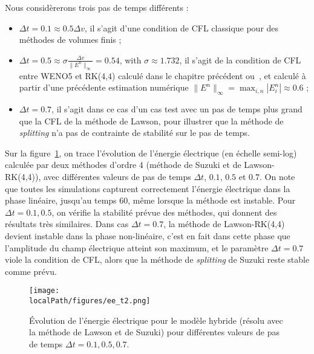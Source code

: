 Nous considèrerons trois pas de temps différents :
\begin{itemize}
  \item $\Delta t = 0.1 \approx 0.5\Delta v$, il s'agit d'une condition de CFL classique pour des méthodes de volumes finis ;
  \item $\Delta t = 0.5 \approx \sigma\frac{\Delta v}{\|E^n\|_\infty} = 0.54$, with $\sigma\approx 1.732$, il s'agit de la condition de CFL entre WENO5 et RK($4$,$4$) calculé dans le chapitre précédent ou~\cite{Crouseilles:2019b}, et calculé à partir d'une précédente estimation numérique $\|E^n\|_\infty = \max_{i,n}|E^n_i|\approx 0.6$ ;
  \item $\Delta t = 0.7$, il s'agit dans ce cas d'un cas test avec un pas de temps plus grand que la CFL de la méthode de Lawson, pour illustrer que la méthode de \emph{splitting} n'a pas de contrainte de stabilité sur le pas de temps.
\end{itemize}

Sur la figure~\ref{fig:compare:ee}, on trace l'évolution de l'énergie électrique (en échelle semi-log) calculée par deux méthodes d'ordre 4 (méthode de Suzuki et de Lawson-RK(4,4)), avec différentes valeurs de pas de temps $\Delta t$, $0.1$, $0.5$ et $0.7$. On note que toutes les simulations capturent correctement l'énergie électrique dans la phase linéaire, jusqu'au temps 60, même lorsque la méthode est instable. Pour $\Delta t=0.1,0.5$, on vérifie la stabilité prévue des méthodes, qui donnent des résultats très similaires. Dans cas $\Delta t=0.7$, la méthode de Lawson-RK(4,4) devient instable dans la phase non-linéaire, c'est en fait dans cette phase que l'amplitude du champ électrique atteint son maximum, et le paramètre $\Delta t=0.7$ viole la condition de CFL, alors que la méthode de \emph{splitting} de Suzuki reste stable comme prévu.

\begin{figure}[h]
  \centering
  \texttt{[image: \\localPath/figures/ee\_t2.png]}
  \caption{Évolution de l'énergie électrique pour le modèle hybride (résolu avec la méthode de Lawson et de Suzuki) pour différentes valeurs de pas de temps $\Delta t=0.1,0.5,0.7$.}
  \label{fig:compare:ee}
\end{figure}


